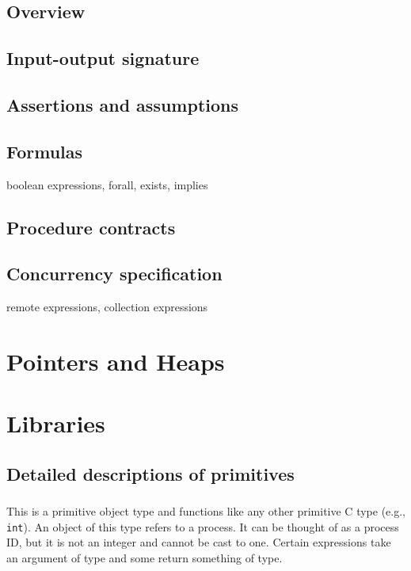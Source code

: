 \section{Overview}

\section{Input-output signature}

\section{Assertions and assumptions}

\section{Formulas}

boolean expressions, forall, exists, implies

\section{Procedure contracts}

\section{Concurrency specification}

remote expressions, collection expressions

\chapter{Pointers and Heaps}

\chapter{Libraries}














\section{Detailed descriptions of primitives}

\subsection{\cproc} This is a primitive object type and functions like
any other primitive C type (e.g., \texttt{int}).  An object of this
type refers to a process.  It can be thought of as a process ID, but
it is not an integer and cannot be cast to one.  Certain expressions
take an argument of \cproc{} type and some return something of
\cproc{} type.

